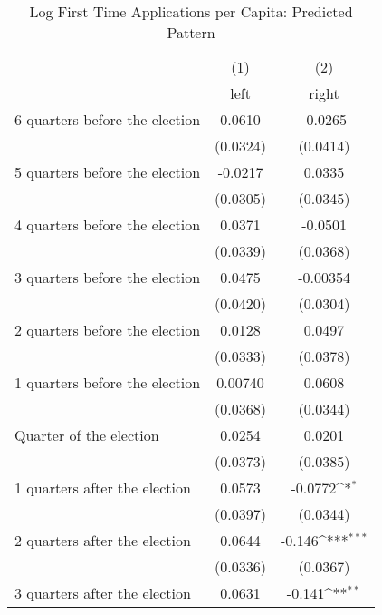 \begin{table}[htbp]\centering
\def\sym#1{\ifmmode^{#1}\else\(^{#1}\)\fi}
\caption{Log First Time Applications per Capita: Predicted Pattern}
\begin{tabular}{l*{2}{c}}
\hline\hline
                    &\multicolumn{1}{c}{(1)}&\multicolumn{1}{c}{(2)}\\
                    &\multicolumn{1}{c}{left}&\multicolumn{1}{c}{right}\\
\hline
 6 quarters before the election&      0.0610         &     -0.0265         \\
                    &    (0.0324)         &    (0.0414)         \\
[1em]
 5 quarters before the election&     -0.0217         &      0.0335         \\
                    &    (0.0305)         &    (0.0345)         \\
[1em]
 4 quarters before the election&      0.0371         &     -0.0501         \\
                    &    (0.0339)         &    (0.0368)         \\
[1em]
 3 quarters before the election&      0.0475         &    -0.00354         \\
                    &    (0.0420)         &    (0.0304)         \\
[1em]
 2 quarters before the election&      0.0128         &      0.0497         \\
                    &    (0.0333)         &    (0.0378)         \\
[1em]
 1 quarters before the election&     0.00740         &      0.0608         \\
                    &    (0.0368)         &    (0.0344)         \\
[1em]
Quarter of the election&      0.0254         &      0.0201         \\
                    &    (0.0373)         &    (0.0385)         \\
[1em]
 1 quarters after the election&      0.0573         &     -0.0772\sym{*}  \\
                    &    (0.0397)         &    (0.0344)         \\
[1em]
 2 quarters after the election&      0.0644         &      -0.146\sym{***}\\
                    &    (0.0336)         &    (0.0367)         \\
[1em]
 3 quarters after the election&      0.0631         &      -0.141\sym{**} \\

\end{tabular}
\end{table}

